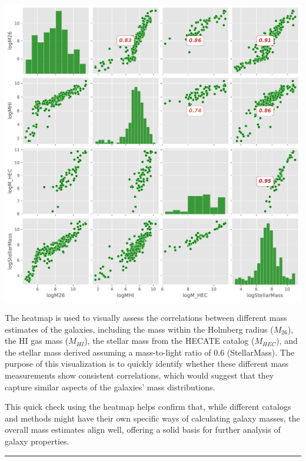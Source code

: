 \documentclass[
]{article}
\begin{document}
\includegraphics{compare_files/figure-pdf/cell-35-output-1.pdf}

The heatmap is used to visually assess the correlations between
different mass estimates of the galaxies, including the mass within the
Holmberg radius (\(M_{26}\)), the HI gas mass (\(M_{HI}\)\hspace{0pt}),
the stellar mass from the HECATE catalog (\(M_{HEC}\)\hspace{0pt}), and
the stellar mass derived assuming a mass-to-light ratio of 0.6
(StellarMass). The purpose of this visualization is to quickly identify
whether these different mass measurements show consistent correlations,
which would suggest that they capture similar aspects of the galaxies'
mass distributions.

This quick check using the heatmap helps confirm that, while different
catalogs and methods might have their own specific ways of calculating
galaxy masses, the overall mass estimates align well, offering a solid
basis for further analysis of galaxy properties.

\begin{center}\rule{0.5\linewidth}{0.5pt}\end{center}
\end{document}
